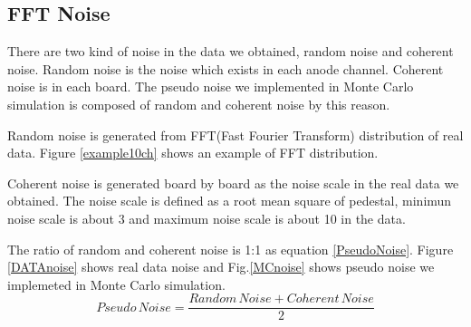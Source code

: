\subsection{FFT Noise}
There are two kind of noise in the data we obtained, random noise and coherent noise.
Random noise is the noise which exists in each anode channel.
Coherent noise is in each board.
The pseudo noise we implemented in Monte Carlo simulation is composed of random and coherent noise by this reason.

Random noise is generated from FFT(Fast Fourier Transform) distribution of real data. Figure \ref{example10ch} shows an example of FFT distribution.

Coherent noise is generated board by board as the noise scale in the real data we obtained.
The noise scale is defined as a root mean square of pedestal, minimun noise scale is about 3 and maximum noise scale is about 10 in the data.

The ratio of random and coherent noise is 1:1 as equation \ref{PseudoNoise}.
Figure \ref{DATAnoise} shows real data noise and Fig.\ref{MCnoise} shows pseudo noise we implemeted in Monte Carlo simulation.
\begin{equation}
  Pseudo\,Noise = \frac{Random\,Noise + Coherent\,Noise}{2}
  \label{PseudoNoise}
\end{equation}

